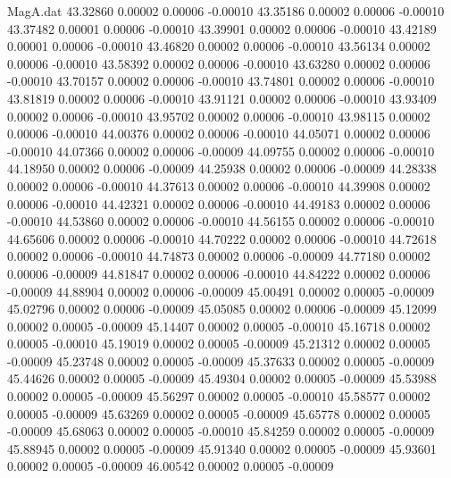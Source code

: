 \begin{filecontents}{MagA.dat}
  43.32860    0.00002    0.00006   -0.00010
  43.35186    0.00002    0.00006   -0.00010
  43.37482    0.00001    0.00006   -0.00010
  43.39901    0.00002    0.00006   -0.00010
  43.42189    0.00001    0.00006   -0.00010
  43.46820    0.00002    0.00006   -0.00010
  43.56134    0.00002    0.00006   -0.00010
  43.58392    0.00002    0.00006   -0.00010
  43.63280    0.00002    0.00006   -0.00010
  43.70157    0.00002    0.00006   -0.00010
  43.74801    0.00002    0.00006   -0.00010
  43.81819    0.00002    0.00006   -0.00010
  43.91121    0.00002    0.00006   -0.00010
  43.93409    0.00002    0.00006   -0.00010
  43.95702    0.00002    0.00006   -0.00010
  43.98115    0.00002    0.00006   -0.00010
  44.00376    0.00002    0.00006   -0.00010
  44.05071    0.00002    0.00006   -0.00010
  44.07366    0.00002    0.00006   -0.00009
  44.09755    0.00002    0.00006   -0.00010
  44.18950    0.00002    0.00006   -0.00009
  44.25938    0.00002    0.00006   -0.00009
  44.28338    0.00002    0.00006   -0.00010
  44.37613    0.00002    0.00006   -0.00010
  44.39908    0.00002    0.00006   -0.00010
  44.42321    0.00002    0.00006   -0.00010
  44.49183    0.00002    0.00006   -0.00010
  44.53860    0.00002    0.00006   -0.00010
  44.56155    0.00002    0.00006   -0.00010
  44.65606    0.00002    0.00006   -0.00010
  44.70222    0.00002    0.00006   -0.00010
  44.72618    0.00002    0.00006   -0.00010
  44.74873    0.00002    0.00006   -0.00009
  44.77180    0.00002    0.00006   -0.00009
  44.81847    0.00002    0.00006   -0.00010
  44.84222    0.00002    0.00006   -0.00009
  44.88904    0.00002    0.00006   -0.00009
  45.00491    0.00002    0.00005   -0.00009
  45.02796    0.00002    0.00006   -0.00009
  45.05085    0.00002    0.00006   -0.00009
  45.12099    0.00002    0.00005   -0.00009
  45.14407    0.00002    0.00005   -0.00010
  45.16718    0.00002    0.00005   -0.00010
  45.19019    0.00002    0.00005   -0.00009
  45.21312    0.00002    0.00005   -0.00009
  45.23748    0.00002    0.00005   -0.00009
  45.37633    0.00002    0.00005   -0.00009
  45.44626    0.00002    0.00005   -0.00009
  45.49304    0.00002    0.00005   -0.00009
  45.53988    0.00002    0.00005   -0.00009
  45.56297    0.00002    0.00005   -0.00010
  45.58577    0.00002    0.00005   -0.00009
  45.63269    0.00002    0.00005   -0.00009
  45.65778    0.00002    0.00005   -0.00009
  45.68063    0.00002    0.00005   -0.00010
  45.84259    0.00002    0.00005   -0.00009
  45.88945    0.00002    0.00005   -0.00009
  45.91340    0.00002    0.00005   -0.00009
  45.93601    0.00002    0.00005   -0.00009
  46.00542    0.00002    0.00005   -0.00009

\end{filecontents}
